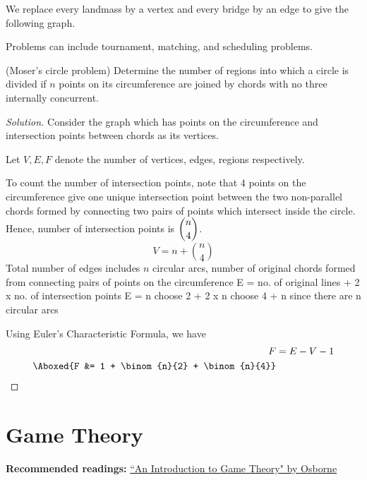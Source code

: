 \begin{solution}
We replace every landmass by a vertex and every bridge by an edge to give the following graph.


\end{solution}
\pagebreak

Problems can include tournament, matching, and scheduling problems.
\begin{prbm}(Moser's circle problem) 
Determine the number of regions into which a circle is divided if $n$ points on its circumference are joined by chords with no three internally concurrent.
\end{prbm}

\begin{proof}[Solution]
Consider the graph which has points on the circumference and intersection points between chords as its vertices.

Let $V, E, F$ denote the number of vertices, edges, regions respectively.

To count the number of intersection points, note that $4$ points on the circumference give one unique intersection point between the two non-parallel chords formed by connecting two pairs of points which intersect inside the circle. Hence, number of intersection points is $\dbinom{n}{4}$. 
\[ V = n + \binom{n}{4} \]
Total number of edges includes $n$ circular arcs, number of original chords formed from connecting pairs of points on the circumference
E = no. of original lines + 2 x no. of intersection points
E = n choose 2 + 2 x n choose 4 + n
since there are n circular arcs

Using Euler's Characteristic Formula, we have 
\begin{align*}
F &= E - V - 1 \\
\Aboxed{F &= 1 + \binom{n}{2} + \binom{n}{4}}
\end{align*}
\end{proof}

\chapter{Game Theory}
\textbf{Recommended readings:} \href{https://mathematicalolympiads.files.wordpress.com/2012/08/martin_j-_osborne-an_introduction_to_game_theory-oxford_university_press_usa2003.pdf}{``An Introduction to Game Theory" by Osborne}


